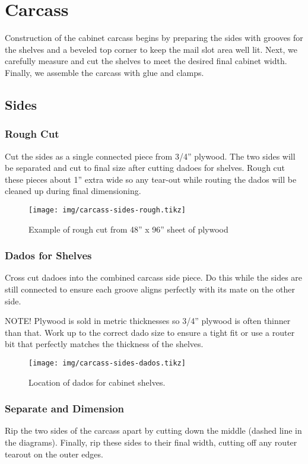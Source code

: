\section{Carcass}
Construction of the cabinet carcass begins by preparing the sides with grooves for the shelves and a beveled top corner to keep the mail slot area well lit. Next, we carefully measure and cut the shelves to meet the desired final cabinet width. Finally, we assemble the carcass with glue and clamps.

\subsection{Sides}

\subsubsection{Rough Cut}
Cut the sides as a single connected piece from 3/4'' plywood. The two sides will be separated and 
cut to final size after cutting dadoes for shelves. Rough cut these pieces about 1'' extra wide so
any tear-out while routing the dados will be cleaned up during final dimensioning.

\begin{figure}[!h]
    \centering
    \texttt{[image: img/carcass-sides-rough.tikz]}
    \caption{Example of rough cut from 48'' x 96'' sheet of plywood\label{fig:carcassrough}}
\end{figure}

\subsubsection{Dados for Shelves}
Cross cut dadoes into the combined carcass side piece. Do this while the sides are still connected to ensure each groove aligns perfectly with its mate on the other side.

NOTE! Plywood is sold in metric thicknesses so 3/4'' plywood is often thinner than that. Work up to the correct dado size to ensure a tight fit or use a router bit that perfectly matches the thickness of the shelves. 

\begin{figure}[!h]
    \centering
    \texttt{[image: img/carcass-sides-dados.tikz]}
    \caption{Location of dados for cabinet shelves.\label{fig:carcassdados}}
\end{figure}

\subsubsection{Separate and Dimension}
Rip the two sides of the carcass apart by cutting down the middle (dashed line in the diagrams). Finally, rip these sides to their final width, cutting off any router tearout on the outer edges.

